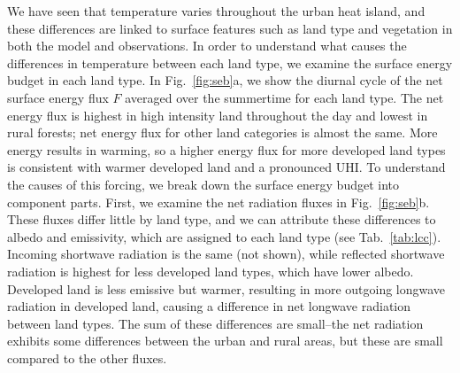 \documentclass[draft,linenumbers]{agujournal}
\begin{document}
We have seen that temperature varies throughout the urban heat island, and these differences are linked to surface features such as land type and vegetation in both the model and observations. 
In order to understand what causes the differences in temperature between each land type, we examine the surface energy budget in each land type. 
 In Fig.~\ref{fig:seb}a, we show the diurnal cycle of the net surface energy flux $F$ averaged over the summertime for each land type. The net energy flux is highest in high intensity land throughout the day and lowest in rural forests; net energy flux for other land categories is almost the same. More energy results in warming, so a higher energy flux for more developed land types is consistent with warmer developed land and a pronounced UHI. 
 To understand the causes of this forcing, we break down the surface energy budget into component parts. First, we examine the net radiation fluxes in Fig.~\ref{fig:seb}b. These fluxes differ little by land type, and we can attribute these differences to albedo and emissivity, which are assigned to each land type (see Tab.~\ref{tab:lcc}). Incoming shortwave radiation is the same (not shown), while reflected shortwave radiation is highest for less developed land types, which have lower albedo. 
Developed land is less emissive but warmer, resulting in more outgoing longwave radiation in developed land, causing a difference in net longwave radiation between land types. 
The sum of these differences are small--the net radiation exhibits some differences between the urban and rural areas, but these are small compared to the other fluxes. 
\end{document}
